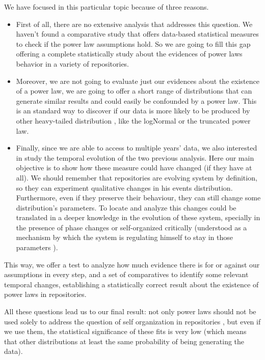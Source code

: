 \documentclass{article}
\begin{document}
We have focused in this particular topic because of three
reasons.\begin{itemize}
\item First of all, there are no extensive analysis that addresses
  this question. We haven't found a comparative study that offers
  data-based statistical measures to check if the power law
  assumptions hold.  So we are going to fill this gap offering a
  complete statistically study about the evidences of power laws
  behavior in a variety of repositories.
\item Moreover, we are not going to evaluate just our evidences about
  the existence of a power law, we are going to offer a short range of
  distributions that can generate similar results and could easily be
  confounded by a power law. This is an standard way to discover if
  our data is more likely to be produced by other heavy-tailed
  distribution \cite{clauset2009power}, like the logNormal or the
  truncated power law.
\item Finally, since we are able to access to multiple years' data, we
  also interested in study the temporal evolution of the two previous
  analysis. Here our main objective is to show how these measure could
  have changed (if they have at all). We should remember that
  repositories are evolving system by definition, so they can
  experiment qualitative changes in his events
  distribution. Furthermore, even if they preserve their behaviour,
  they can still change some distribution's parameters.  To locate and
  analyze this changes could be translated in a deeper knowledge in
  the evolution of these system, specially in the presence of phase
  changes \cite{merelo2017self} or self-organized critically
  (understood as a mechanism by which the system is regulating himself
  to stay in those parameters \cite{newman2005power}).
\end{itemize}

This way, we offer a test to analyze how much evidence there is for or
against our assumptions in every step, and a set of comparatives to
identify some relevant temporal changes, establishing a statistically
correct result about the existence of power laws in repositories.

All these questions lead us to our final result: not only power laws
should not be used solely to address the question of self organization
in repositories \cite{alderson2010contrasting}, but even if we use
them, the statistical significance of these fits is very low (which
means that other distributions at least the same probability of being
generating the data).
\end{document}
